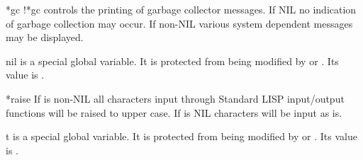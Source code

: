 \begin{Variable}{*gc}
!*gc controls the printing of garbage collector messages.  If NIL no
indication of garbage collection may occur.  If non-NIL various system
dependent messages may be displayed.
\end{Variable}


\begin{Variable}{nil}
 is a special global variable. It is protected from being modified
by  or . Its value is .
\end{Variable}

\begin{Variable}{*raise}
If  is non-NIL all characters input through Standard LISP
input/output functions will be raised to upper case. If  is NIL
characters will be input as is.
\end{Variable}


\begin{Variable}{t}
 is a special global variable. It is protected from being modified
by  or . Its value is .
\end{Variable}


